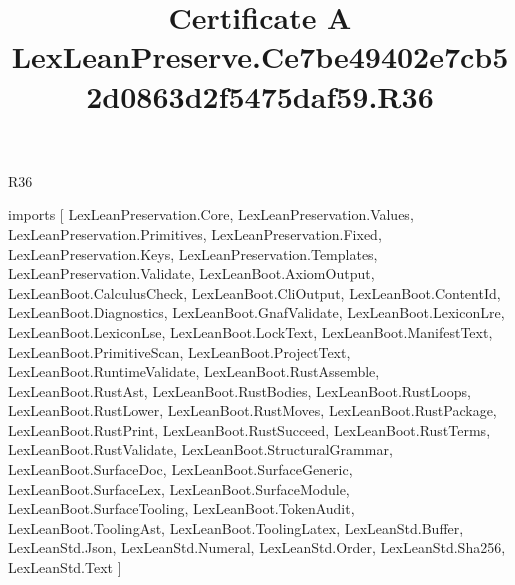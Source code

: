 \begin{lexlean}{R36}
\title{Certificate A LexLeanPreserve.Ce7be49402e7cb52d0863d2f5475daf59.R36}
\begin{coremodule}
imports [
  LexLeanPreservation.Core,
  LexLeanPreservation.Values,
  LexLeanPreservation.Primitives,
  LexLeanPreservation.Fixed,
  LexLeanPreservation.Keys,
  LexLeanPreservation.Templates,
  LexLeanPreservation.Validate,
  LexLeanBoot.AxiomOutput,
  LexLeanBoot.CalculusCheck,
  LexLeanBoot.CliOutput,
  LexLeanBoot.ContentId,
  LexLeanBoot.Diagnostics,
  LexLeanBoot.GnafValidate,
  LexLeanBoot.LexiconLre,
  LexLeanBoot.LexiconLse,
  LexLeanBoot.LockText,
  LexLeanBoot.ManifestText,
  LexLeanBoot.PrimitiveScan,
  LexLeanBoot.ProjectText,
  LexLeanBoot.RuntimeValidate,
  LexLeanBoot.RustAssemble,
  LexLeanBoot.RustAst,
  LexLeanBoot.RustBodies,
  LexLeanBoot.RustLoops,
  LexLeanBoot.RustLower,
  LexLeanBoot.RustMoves,
  LexLeanBoot.RustPackage,
  LexLeanBoot.RustPrint,
  LexLeanBoot.RustSucceed,
  LexLeanBoot.RustTerms,
  LexLeanBoot.RustValidate,
  LexLeanBoot.StructuralGrammar,
  LexLeanBoot.SurfaceDoc,
  LexLeanBoot.SurfaceGeneric,
  LexLeanBoot.SurfaceLex,
  LexLeanBoot.SurfaceModule,
  LexLeanBoot.SurfaceTooling,
  LexLeanBoot.TokenAudit,
  LexLeanBoot.ToolingAst,
  LexLeanBoot.ToolingLatex,
  LexLeanStd.Buffer,
  LexLeanStd.Json,
  LexLeanStd.Numeral,
  LexLeanStd.Order,
  LexLeanStd.Sha256,
  LexLeanStd.Text
]


\end{coremodule}
\end{lexlean}
